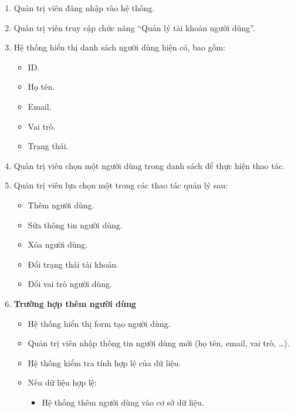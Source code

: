 \begin{enumerate}
    \item Quản trị viên đăng nhập vào hệ thống.
    
    \item Quản trị viên truy cập chức năng ``Quản lý tài khoản người dùng''.
    
    \item Hệ thống hiển thị danh sách người dùng hiện có, bao gồm:
    \begin{itemize}
        \item ID.
        \item Họ tên.
        \item Email.
        \item Vai trò.
        \item Trạng thái.
    \end{itemize}
    
    \item Quản trị viên chọn một người dùng trong danh sách để thực hiện thao tác.
    
    \item Quản trị viên lựa chọn một trong các thao tác quản lý sau:
    \begin{itemize}
        \item Thêm người dùng.
        \item Sửa thông tin người dùng.
        \item Xóa người dùng.
        \item Đổi trạng thái tài khoản.
        \item Đổi vai trò người dùng.
    \end{itemize}

    \item \textbf{Trường hợp thêm người dùng}
    \begin{itemize}
        \item Hệ thống hiển thị form tạo người dùng.
        
        \item Quản trị viên nhập thông tin người dùng mới (họ tên, email, vai trò, \ldots).
        
        \item Hệ thống kiểm tra tính hợp lệ của dữ liệu.
        
        \item Nếu dữ liệu hợp lệ:
        \begin{itemize}
            \item Hệ thống thêm người dùng vào cơ sở dữ liệu.
            

\end{itemize}
\end{itemize}
\end{enumerate}
